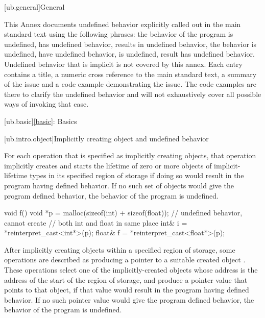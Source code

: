 
[ub.general]{General}

This Annex documents undefined behavior explicitly called out in the main standard text using the
following phrases: the behavior of the program is undefined, has undefined behavior, results in
undefined behavior, the behavior is undefined, have undefined behavior, is undefined, result has
undefined behavior. Undefined behavior that is implicit is not covered by this annex. Each entry contains
a title, a numeric cross reference to the main standard text, a summary of the issue and a code example
demonstrating the issue. The code examples are there to clarify the undefined behavior and will not
exhaustively cover all possible ways of invoking that case.

[ub.basic]{\ref{basic}: Basics}

[ub.intro.object]{Implicitly creating object and undefined behavior}

\pnum
{}
For each
operation that is specified as implicitly creating objects, that operation implicitly creates and starts the
lifetime of zero or more objects of implicit-lifetime types  in its specified region of storage if doing so
would result in the program having defined behavior. If no such set of objects would give the program defined
behavior, the behavior of the program is undefined.

\pnum
\begin{example}
\begin{codeblock}
void f()
{
  void *p = malloc(sizeof(int) + sizeof(float));    // undefined behavior, cannot create
                                                    // both int and float in same place
  int& i = *reinterpret_cast<int*>(p);
  float& f = *reinterpret_cast<float*>(p);
}
\end{codeblock}
\end{example}


\pnum
{}
After implicitly creating objects within a specified region of storage,
some operations are described as producing a pointer to a
suitable created object .
These operations select one of the implicitly-created objects
whose address is the address of the start of the region of storage,
and produce a pointer value that points to that object,
if that value would result in the program having defined behavior.
If no such pointer value would give the program defined behavior,
the behavior of the program is undefined.

